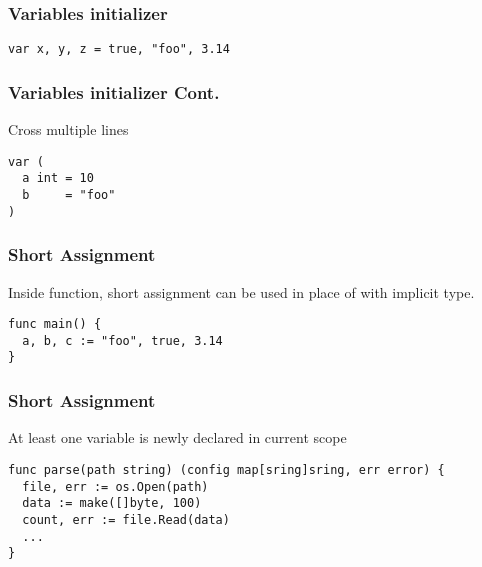 \documentclass[xetex,mathserif,serif,12pt]{beamer}
\begin{document}
\begin{frame}[fragile]
  \frametitle{Variables initializer}

  \begin{beamer@nomargin}
    \begin{lstlisting}
var x, y, z = true, "foo", 3.14
    \end{lstlisting}
  \end{beamer@nomargin}
\end{frame}

\begin{frame}[fragile]
  \frametitle{Variables initializer Cont.}

  Cross multiple lines
  \newline

  \begin{beamer@nomargin}
    \begin{lstlisting}
var (
  a int = 10
  b     = "foo"
)
    \end{lstlisting}
  \end{beamer@nomargin}
\end{frame}

\begin{frame}[fragile]
  \frametitle{Short Assignment}

  \alert{Inside function}, \hltexttt{:=} short assignment can
  be used in place of  with implicit type.
  \newline

  \begin{beamer@nomargin}
    \begin{lstlisting}
func main() {
  a, b, c := "foo", true, 3.14
}
    \end{lstlisting}
  \end{beamer@nomargin}
\end{frame}

\begin{frame}[fragile]
  \frametitle{Short Assignment}

  At least one variable is newly declared in current scope

  \begin{beamer@nomargin}
    \begin{lstlisting}
func parse(path string) (config map[sring]sring, err error) {
  file, err := os.Open(path)
  data := make([]byte, 100)
  count, err := file.Read(data)
  ...
}
    \end{lstlisting}
  \end{beamer@nomargin}
\end{frame}
\end{document}
